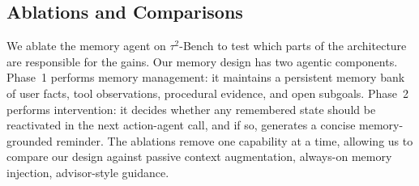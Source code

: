 \begin{table}[t]
\centering
\small
\setlength{\tabcolsep}{4pt}
\caption{
Ablations on $\tau^2$-Bench with Sonnet 4.5 as the action agent, Opus 4.6 as the memory agent for all experiments. Scores are
pass@1 percentages. Macro averages domains equally, micro is task-weighted.
}
\label{tab:ablation_all}
\end{table}


\subsection{Ablations and Comparisons}

We ablate the memory agent on $\tau^2$-Bench to test which parts of the architecture are responsible for the gains. Our memory design has two agentic components. Phase~1 performs memory management: it maintains a persistent memory bank of user facts, tool observations, procedural evidence, and open subgoals. Phase~2 performs intervention: it decides whether any remembered state should be reactivated in the next action-agent call, and if so, generates a concise memory-grounded reminder. The ablations remove one capability at a time, allowing us to compare our design against passive context augmentation, always-on memory injection, advisor-style guidance.

